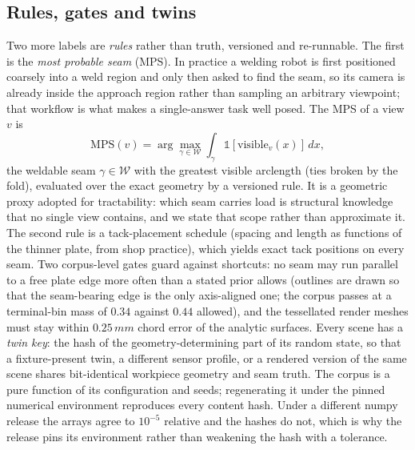 \documentclass[letterpaper, 10 pt, conference]{ieeeconf}
\newcommand{\mm}{\,mm}
\begin{document}
\subsection{Rules, gates and twins}
Two more labels are \emph{rules} rather than truth, versioned and re-runnable. The first is the \emph{most probable seam} (MPS). In practice a welding robot is first positioned coarsely into a weld region and only then asked to find the seam, so its camera is already inside the approach region rather than sampling an arbitrary viewpoint; that workflow is what makes a single-answer task well posed. The MPS of a view $v$ is
\begin{equation}
\mathrm{MPS}(v) = \arg\max_{\gamma\in\mathcal{W}} \int_{\gamma} \mathbb{1}[\text{visible}_v(x)]\,dx,
\label{eq:mps}
\end{equation}
the weldable seam $\gamma\in\mathcal{W}$ with the greatest visible arclength (ties broken by the fold), evaluated over the exact geometry by a versioned rule. It is a geometric proxy adopted for tractability: which seam carries load is structural knowledge that no single view contains, and we state that scope rather than approximate it. The second rule is a tack-placement schedule (spacing and length as functions of the thinner plate, from shop practice), which yields exact tack positions on every seam. Two corpus-level gates guard against shortcuts: no seam may run parallel to a free plate edge more often than a stated prior allows (outlines are drawn so that the seam-bearing edge is the only axis-aligned one; the corpus passes at a terminal-bin mass of $0.34$ against $0.44$ allowed), and the tessellated render meshes must stay within $0.25\mm$ chord error of the analytic surfaces. Every scene has a \emph{twin key}: the hash of the geometry-determining part of its random state, so that a fixture-present twin, a different sensor profile, or a rendered version of the same scene shares bit-identical workpiece geometry and seam truth. The corpus is a pure function of its configuration and seeds; regenerating it under the pinned numerical environment reproduces every content hash. Under a different numpy release the arrays agree to $10^{-5}$ relative and the hashes do not, which is why the release pins its environment rather than weakening the hash with a tolerance.
\end{document}
